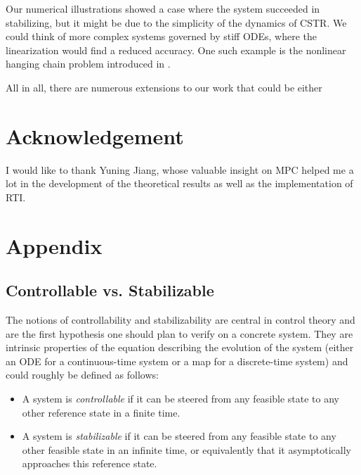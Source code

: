\documentclass[12pt]{article}
\begin{document}
Our numerical illustrations showed a case where the system succeeded in stabilizing, but it might be due to the simplicity of the dynamics of CSTR.
We could think of more complex systems governed by stiff ODEs, where the linearization would find a reduced accuracy.
One such example is the nonlinear hanging chain problem introduced in \cite{hanging-chain}.

All in all, there are numerous extensions to our work that could be either

\section*{Acknowledgement}

I would like to thank Yuning Jiang, whose valuable insight on MPC helped me a lot in the development of the theoretical results as well as the implementation of RTI.

\newpage

\section{Appendix}

\subsection{Controllable vs. Stabilizable}\label{sec:controllability-stabilizability}

The notions of controllability and stabilizability are central in control theory and are the first hypothesis one should plan to verify on a concrete system.
They are intrinsic properties of the equation describing the evolution of the system (either an ODE for a continuous-time system or a map for a discrete-time system) and could roughly be defined as follows:
\begin{itemize}[label=\textbullet]
	\item A system is \textit{controllable} if it can be steered from any feasible state to any other reference state in a finite time.
	\item A system is \textit{stabilizable} if it can be steered from any feasible state to any other feasible state in an infinite time, or equivalently that it asymptotically approaches this reference state.
\end{itemize}
\end{document}
